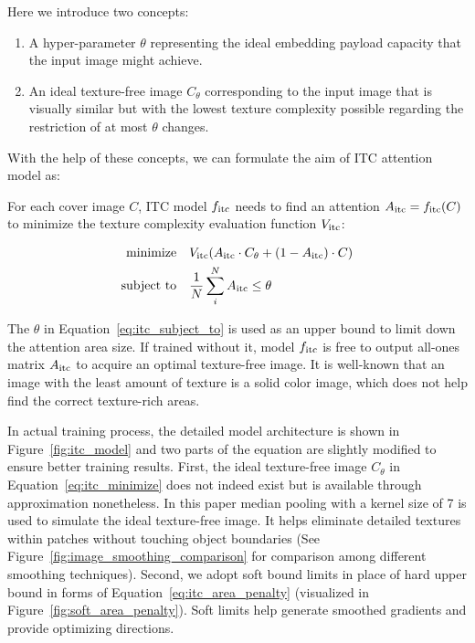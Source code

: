 Here we introduce two concepts:
\begin{enumerate}
  \item A hyper-parameter \( \theta \) representing the ideal embedding payload capacity that the input image might achieve.
  \item An ideal texture-free image \(C_{\theta}\) corresponding to the input image that is visually similar but with the lowest texture complexity possible regarding the restriction of at most \( \theta \) changes.
\end{enumerate}

With the help of these concepts, we can formulate the aim of ITC attention model as:

For each cover image \(C\), ITC model \(f_{\text{itc}}\) needs to find an attention \(A_{\text{itc}} = f_{\text{itc}}(C)\) to minimize the texture complexity evaluation function \(V_{\text{itc}}\):

\begin{align}
  \text{minimize}   \quad & V_{\text{itc}}(A_{\text{itc}} \cdot C_{\theta} + (1 - A_{\text{itc}}) \cdot C)
  \label{eq:itc_minimize}                                                                         \\
  \text{subject to} \quad & \frac{1}{N} \sum_{i}^{N} A_{\text{itc}} \leq \theta \label{eq:itc_subject_to}
\end{align}

The \( \theta \) in Equation~\ref{eq:itc_subject_to} is used as an upper bound to limit down the attention area size. If trained without it, model \(f_{\text{itc}}\) is free to output all-ones matrix \(A_{\text{itc}}\) to acquire an optimal texture-free image. It is well-known that an image with the least amount of texture is a solid color image, which does not help find the correct texture-rich areas.


In actual training process, the detailed model architecture is shown in Figure~\ref{fig:itc_model} and two parts of the equation are slightly modified to ensure better training results. First, the ideal texture-free image \(C_{\theta}\) in Equation~\ref{eq:itc_minimize} does not indeed exist but is available through approximation nonetheless. In this paper median pooling with a kernel size of 7 is used to simulate the ideal texture-free image. It helps eliminate detailed textures within patches without touching object boundaries (See Figure~\ref{fig:image_smoothing_comparison} for comparison among different smoothing techniques). Second, we adopt soft bound limits in place of hard upper bound in forms of Equation~\ref{eq:itc_area_penalty} (visualized in Figure~\ref{fig:soft_area_penalty}). Soft limits help generate smoothed gradients and provide optimizing directions.

